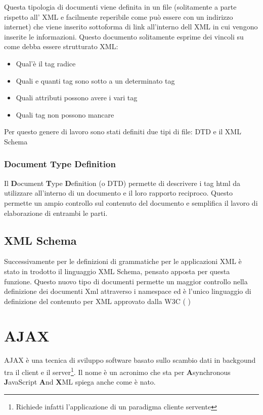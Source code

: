 \documentclass[a4paper,14pt]{article}
\begin{document}
Questa tipologia di documenti viene definita in un file (solitamente a parte rispetto all' XML e facilmente reperibile come può essere con un indirizzo internet) che viene inserito sottoforma di link all'interno dell XML in cui vengono inserite le informazioni. Questo documento solitamente esprime dei vincoli su come debba essere strutturato XML: 
\begin{itemize}
\item Qual'è il tag radice
\item Quali e quanti tag sono sotto a un determinato tag
\item Quali attributi possono avere i vari tag
\item Quali tag non possono mancare 
\end{itemize}

Per questo genere di lavoro sono stati definiti due tipi di file: DTD e il XML Schema 

\subsubsection{Document Type Definition}
Il \textbf{D}ocument \textbf{T}ype \textbf{D}efinition (o DTD) permette di descrivere i tag html da utilizzare all'interno di un documento e il loro rapporto reciproco. Questo permette un ampio controllo sul contenuto del documento e semplifica il lavoro di elaborazione di entrambi le parti. 

\subsection{XML Schema}
Successivamente per le definizioni di grammatiche per le applicazioni XML è stato in trodotto il linguaggio XML Schema, pensato apposta per questa funzione. Questo nuovo tipo di documenti permette un maggior controllo nella definizione dei documenti Xml attraverso i namespace ed è l'unico linguaggio di definizione del contenuto per XML approvato dalla W3C (\cite{site:w3cxmlschame} )


\section{AJAX}
AJAX è una tecnica di sviluppo software basato sullo scambio dati in backgound tra il client e il server\footnote{Richiede infatti l'applicazione di un paradigma cliente servente}.  Il nome è un acronimo che sta per \textbf{A}synchronous \textbf{J}avaScript \textbf{A}nd \textbf{X}ML spiega anche come è nato.
\end{document}
